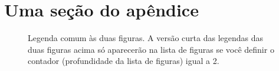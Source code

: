 \lipsum[1]

\section{Uma seção do apêndice}

\lipsum[2]

	\begin{figure}
		\centering
		
		\null\hfill
		\hfill
		\hfill\null
		
		\caption[Legenda curta]{Legenda comum às duas figuras. A versão curta das legendas das duas figuras acima só aparecerão na lista de figuras se você definir o contador  (profundidade da lista de figuras) igual a 2.}
		\label{fig:AB}
	\end{figure}
	
\lipsum[6-7]